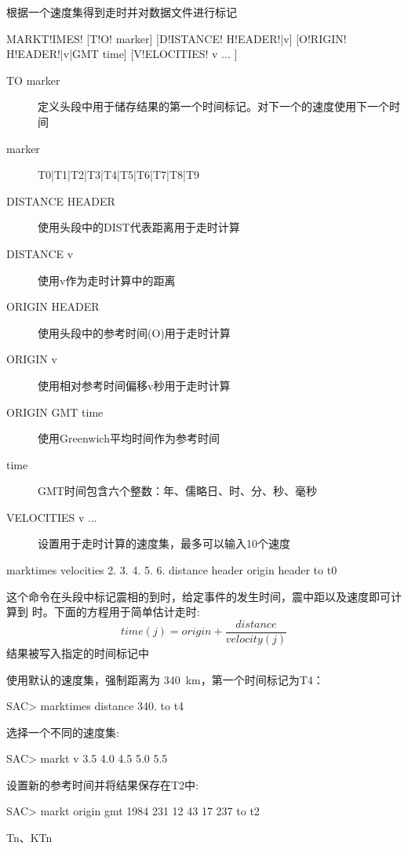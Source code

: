 \label{cmd:marktimes}

根据一个速度集得到走时并对数据文件进行标记

\begin{SACSTX}
MARKT!IMES! [T!O! marker] [D!ISTANCE! H!EADER!|v] [O!RIGIN! H!EADER!|v|GMT time]
    [V!ELOCITIES! v ... ]
\end{SACSTX}

\begin{description}
\item [TO marker] 定义头段中用于储存结果的第一个时间标记。对下一个的速度使用下一个时间
\item [marker]  T0|T1|T2|T3|T4|T5|T6|T7|T8|T9
\item [DISTANCE HEADER] 使用头段中的DIST代表距离用于走时计算
\item [DISTANCE v] 使用v作为走时计算中的距离
\item [ORIGIN HEADER] 使用头段中的参考时间(O)用于走时计算
\item [ORIGIN v] 使用相对参考时间偏移v秒用于走时计算
\item [ORIGIN GMT time] 使用Greenwich平均时间作为参考时间
\item [time] GMT时间包含六个整数：年、儒略日、时、分、秒、毫秒
\item [VELOCITIES v ... ] 设置用于走时计算的速度集，最多可以输入10个速度
\end{description}

\begin{SACDFT}
marktimes velocities 2. 3. 4. 5. 6. distance
    header origin header to t0
\end{SACDFT}

这个命令在头段中标记震相的到时，给定事件的发生时间，震中距以及速度即可计算到	时。下面的方程用于简单估计走时:
 		\[ time(j) = origin + \frac{distance}{velocity(j)} \]
结果被写入指定的时间标记中

使用默认的速度集，强制距离为 \SI{340}{\km}，第一个时间标记为T4：
\begin{SACCode}
SAC> marktimes distance 340. to t4
\end{SACCode}

选择一个不同的速度集:
\begin{SACCode}
SAC> markt v 3.5 4.0 4.5 5.0 5.5
\end{SACCode}

设置新的参考时间并将结果保存在T2中:
\begin{SACCode}
SAC> markt origin gmt 1984 231 12 43 17 237 to t2
\end{SACCode}

Tn、KTn
